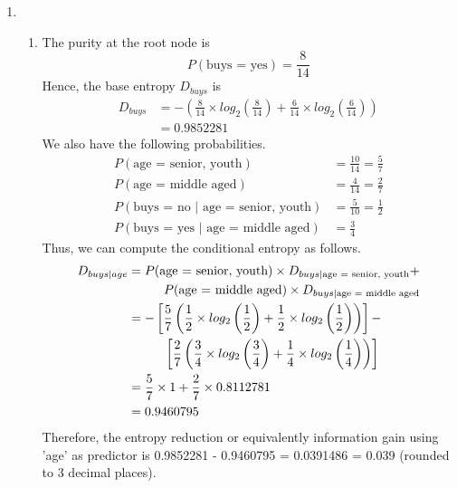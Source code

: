 \documentclass{article}
\begin{document}
\begin{enumerate}
    \item
    \begin{enumerate}
        \item The purity at the root node is
        \[P(\text{buys = yes})=\frac{8}{14}\]
        Hence, the base entropy $D_{buys}$ is
        \begin{align*}
            D_{buys}&=-\left(\frac{8}{14}\times log_2\left(\frac{8}{14}\right)+\frac{6}{14}\times log_2\left(\frac{6}{14}\right)\right)\\
            &= 0.9852281
        \end{align*}
        We also have the following probabilities.
        \begin{align*}
            P(\text{age = senior, youth})&=\frac{10}{14}=\frac{5}{7}\\
            P(\text{age = middle aged})&=\frac{4}{14}=\frac{2}{7}\\
            P(\text{buys = no }\vert\text{ age = senior, youth}) &= \frac{5}{10} = \frac{1}{2}\\
            P(\text{buys = yes }\vert\text{ age = middle aged})&=\frac{3}{4}
        \end{align*}
        Thus, we can compute the conditional entropy as follows.
        \begin{align*}
            D_{buys \vert age}&=P(\text{age = senior, youth}) \times D_{buys \vert \text{age = senior, youth}} +\\&\hspace{1 cm}P(\text{age = middle aged}) \times D_{buys \vert \text{age = middle aged}}\\
            &= -\left[\frac{5}{7}\left(\frac{1}{2}\times log_2\left(\frac{1}{2}\right)+\frac{1}{2}\times log_2\left(\frac{1}{2}\right)\right)\right]-\\
            &\hspace{1 cm}\left[\frac{2}{7}\left(\frac{3}{4}\times log_2\left(\frac{3}{4}\right)+\frac{1}{4}\times log_2\left(\frac{1}{4}\right)\right)\right]\\
            &=\frac{5}{7}\times1+\frac{2}{7}\times0.8112781\\
            &= 0.9460795
        \end{align*}
        Therefore, the entropy reduction or equivalently information gain using 'age' as predictor is 0.9852281 - 0.9460795 = 0.0391486 = 0.039 (rounded to 3 decimal places).
        

\end{enumerate}
\end{enumerate}
\end{document}
